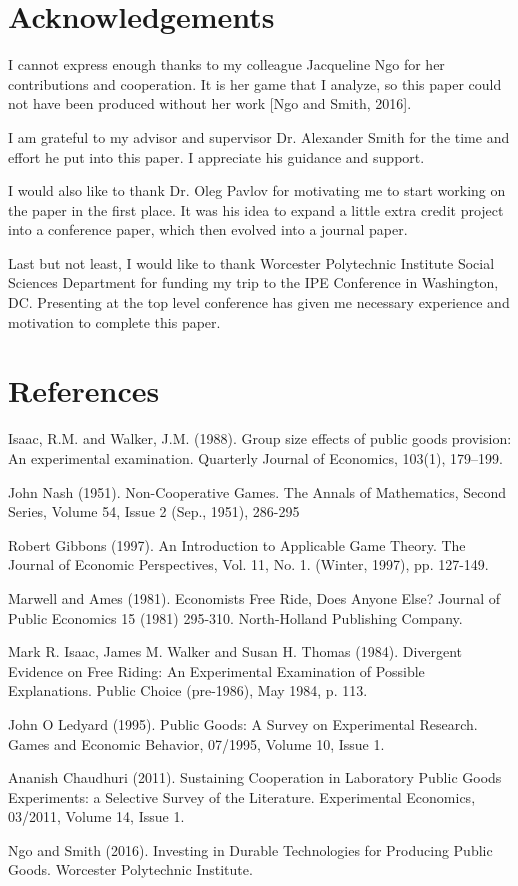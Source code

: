 \section{Acknowledgements}

	I cannot express enough thanks to my colleague Jacqueline Ngo for her contributions and cooperation. It is her game that I analyze, so this paper could not have been produced without her work [Ngo and Smith, 2016].

	I am grateful to my advisor and supervisor Dr. Alexander Smith for the time and effort he put into this paper. I appreciate his guidance and support.

	I would also like to thank Dr. Oleg Pavlov for motivating me to start working on the paper in the first place. It was his idea to expand a little extra credit project into a conference paper, which then evolved into a journal paper.

	Last but not least, I would like to thank Worcester Polytechnic Institute Social Sciences Department for funding my trip to the IPE Conference in Washington, DC. Presenting at the top level conference has given me necessary experience and motivation to complete this paper.

\section{References}

	Isaac, R.M. and Walker, J.M. (1988). Group size effects of public goods provision: An experimental examination. Quarterly Journal of Economics, 103(1), 179–199.

	John Nash (1951). Non-Cooperative Games. The Annals of Mathematics, Second Series, Volume 54, Issue 2 (Sep., 1951), 286-295

	Robert Gibbons (1997). An Introduction to Applicable Game Theory. The Journal of Economic Perspectives, Vol. 11, No. 1. (Winter, 1997), pp. 127-149.

	Marwell and Ames (1981). Economists Free Ride, Does Anyone Else? Journal of Public Economics 15 (1981) 295-310. North-Holland Publishing Company.

	Mark R. Isaac, James M. Walker and Susan H. Thomas (1984). Divergent Evidence on Free Riding: An Experimental Examination of Possible Explanations. Public Choice (pre-1986), May 1984, p. 113.

	John O Ledyard (1995). Public Goods: A Survey on Experimental Research. Games and Economic Behavior, 07/1995, Volume 10, Issue 1. 
	
	Ananish Chaudhuri (2011). Sustaining Cooperation in Laboratory Public Goods Experiments: a Selective Survey of the Literature. Experimental Economics, 03/2011, Volume 14, Issue 1.

	Ngo and Smith (2016). Investing in Durable Technologies for Producing Public Goods. Worcester Polytechnic Institute.
